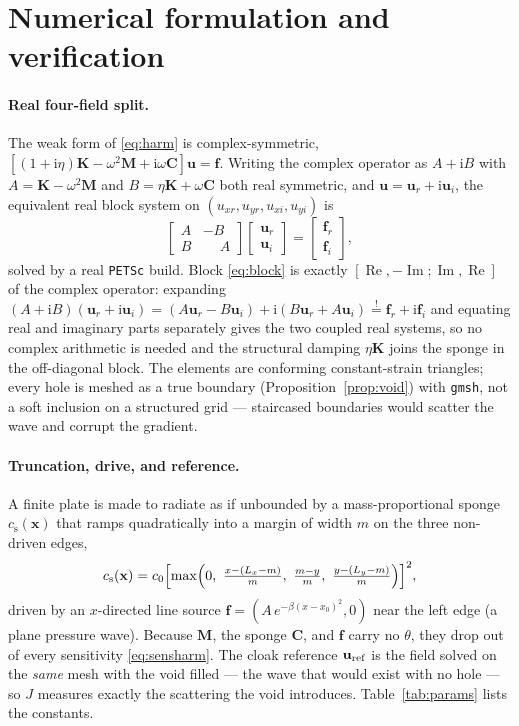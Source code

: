 \documentclass[preprint,11pt]{elsarticle}
\newcommand{\vu}{\mathbf{u}}
\newcommand{\vx}{\mathbf{x}}
\newcommand{\vf}{\mathbf{f}}
\newcommand{\ii}{\mathrm{i}}
\newcommand{\Kmat}{\mathbf{K}}
\newcommand{\Mmat}{\mathbf{M}}
\newcommand{\Real}{\operatorname{Re}}
\newcommand{\Imag}{\operatorname{Im}}
\theoremstyle{plain}\newtheorem{proposition}{Proposition}
\theoremstyle{remark}\newtheorem{remark}{Remark}
\begin{document}
\section{Numerical formulation and verification}
\label{sec:num}
\paragraph{Real four-field split.} The weak form of \eqref{eq:harm} is complex-symmetric,
$[(1+\ii\eta)\Kmat-\omega^2\Mmat+\ii\omega\mathbf C]\vu=\vf$. Writing the complex operator
as $A+\ii B$ with $A=\Kmat-\omega^2\Mmat$ and $B=\eta\Kmat+\omega\mathbf C$ both real
symmetric, and $\vu=\vu_r+\ii\vu_i$, the equivalent real block system on
$(u_{xr},u_{yr},u_{xi},u_{yi})$ is
\begin{equation}
  \begin{bmatrix} A & -B\\ B & \phantom{-}A\end{bmatrix}
  \begin{bmatrix}\vu_r\\ \vu_i\end{bmatrix}=\begin{bmatrix}\vf_r\\ \vf_i\end{bmatrix},
  \label{eq:block}
\end{equation}
solved by a real \texttt{PETSc} build. Block \eqref{eq:block} is exactly
$[\Real,-\Imag;\Imag,\Real]$ of the complex operator: expanding
$(A+\ii B)(\vu_r+\ii\vu_i)=(A\vu_r-B\vu_i)+\ii(B\vu_r+A\vu_i)\overset{!}{=}\vf_r+\ii\vf_i$
and equating real and imaginary parts separately gives the two coupled real systems, so no
complex arithmetic is needed and the structural damping $\eta\Kmat$ joins the sponge in the
off-diagonal block. The elements are conforming constant-strain triangles; every hole is
meshed as a true boundary (Proposition~\ref{prop:void}) with \texttt{gmsh}, not a soft
inclusion on a structured grid --- staircased boundaries would scatter the wave and corrupt
the gradient.

\paragraph{Truncation, drive, and reference.} A finite plate is made to radiate as if
unbounded by a mass-proportional sponge $c_{\mathrm s}(\vx)$ that ramps quadratically into
a margin of width $m$ on the three non-driven edges,
\begin{equation}
  c_{\mathrm s}(\vx)=c_0\Bigl[\max\Bigl(0,\ \tfrac{x-(L_x-m)}{m},\ \tfrac{m-y}{m},\
  \tfrac{y-(L_y-m)}{m}\Bigr)\Bigr]^2 ,
  \label{eq:sponge}
\end{equation}
driven by an $x$-directed line source $\vf=(A\,e^{-\beta(x-x_0)^2},0)$ near the left edge (a
plane pressure wave). Because $\Mmat$, the sponge $\mathbf C$, and $\vf$ carry no $\theta$,
they drop out of every sensitivity \eqref{eq:sensharm}. The cloak reference $\vu_{\rm ref}$
is the field solved on the \emph{same} mesh with the void filled --- the wave that would
exist with no hole --- so $J$ measures exactly the scattering the void introduces.
Table~\ref{tab:params} lists the constants.
\end{document}
